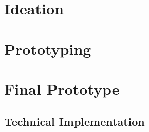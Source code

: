 \section{Ideation}
\section{Prototyping}
\section{Final Prototype}
\subsection{Technical Implementation}
